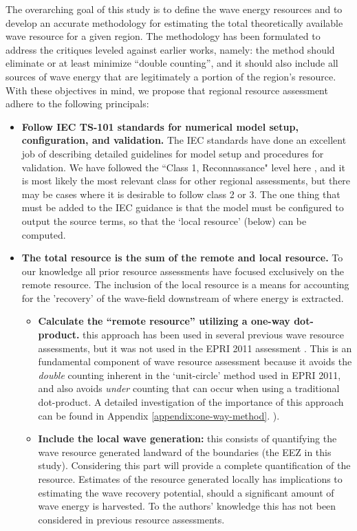 \hline

The overarching goal of this study is to define the wave energy resources and to develop an accurate methodology for estimating the total theoretically available wave resource for a given region. The methodology has been formulated to address the critiques leveled against earlier works, namely: the method should eliminate or at least minimize ``double counting'', and it should also include all sources of wave energy that are legitimately a portion of the region's resource. With these objectives in mind, we propose that regional resource assessment adhere to the following principals:

\begin{itemize}
\item {\bf Follow IEC TS-101 standards for numerical model setup, configuration, and validation.} The IEC standards have done an excellent job of describing detailed guidelines for model setup and procedures for validation. We have followed the ``Class 1, Reconnassance" level here , and it is most likely the most relevant class for other regional assessments, but there may be cases where it is desirable to follow class 2 or 3. The one thing that must be added to the IEC guidance is that the model must be configured to output the source terms, so that the `local resource' (below) can be computed.
\item {\bf The total resource is the sum of the remote and local resource.} To our knowledge all prior resource assessments have focused exclusively on the remote resource. The inclusion of the local resource is a means for accounting for the 'recovery' of the wave-field downstream of where energy is extracted.
\begin{itemize}
    \item {\bf Calculate the ``remote resource'' utilizing a one-way dot-product.} this approach has been used in several previous wave resource assessments, but it was not used in the EPRI 2011 assessment . This is an fundamental component of wave resource assessment because it avoids the {\em double} counting inherent in the `unit-circle' method used in EPRI 2011, and also avoids {\em under} counting that can occur when using a traditional dot-product. A detailed investigation of the importance of this approach can be found in Appendix \ref{appendix:one-way-method}. \cite{EPRIwaveresource2011}).
    \item {\bf Include the local wave generation:} this consists of quantifying the wave resource generated landward of the boundaries (the EEZ in this study). Considering this part will provide a complete quantification of the resource. Estimates of the resource generated locally has implications to estimating the wave recovery potential, should a significant amount of wave energy is harvested. To the authors' knowledge this has not been considered in previous resource assessments.

\end{itemize}
\end{itemize}

